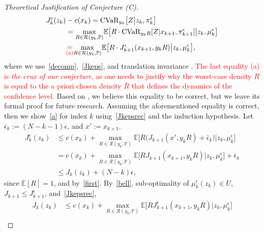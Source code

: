 \documentclass[letterpaper, 10 pt, conference]{ieeeconf}  %
\newcommand{\mpc}[1]{{\color{cyan} #1}}
\newcommand{\mpc}[1]{#1}
\begin{document}
\begin{proof}[Theoretical Justification of Conjecture (C)]
%
\begin{equation*}\begin{aligned}
J_k^\epsilon(z_k)& - c(x_k) = \text{CVaR}_{y_k}\big[ Z \big| z_k, \pi_k^\epsilon \big]\\
& = {\underset{R \in \mathcal{R}(y_k, \mathbb{P})}\max}\mathbb{E}\big[ R\cdot \text{CVaR}_{y_k R}[ Z | x_{k+1}, \pi^\epsilon_{k+1} ] \big| z_k, \mu_k^\epsilon \big] \\
& \textcolor{red}{\underset{(a)}{=}} {\underset{R \in \mathcal{R}(y_k, \mathbb{P})}\max}\mathbb{E}\big[ R\cdot J_{k+1}^\epsilon(x_{k+1},y_k R) \big| z_k, \mu_k^\epsilon \big],
\end{aligned}\end{equation*}
%
where we use~\eqref{decomp},~\eqref{Jkeps}, and translation invariance\footnotemark 
{}. \textcolor{red}{The last equality (a) is {\em the crux of our conjecture}, as one needs to justify why the worst-case density $R$ is equal to the a priori chosen density $\bar{R}$ that defines the dynamics of the confidence level.} \mpc{Based on \cite{chow2015risk}, we believe this equality to be correct, but we leave its formal proof for future research}. \mpc{Assuming the aforementioned equality is correct, then we} show~\eqref{a} for index $k$ using~\eqref{Jkepsrec} and the induction hypothesis. Let $\bar{\epsilon}_k := (N-k-1)\epsilon$, and $x' := x_{k+1}$.
%
\begin{equation*}\begin{aligned}
J_k^\epsilon(z_k) & \leq c(x_k) + {\underset{R \in \mathcal{R}(y_k, \mathbb{P})}\max} \mathbb{E}\big[ R\big(J_{k+1}(x',y_k R) + \bar{\epsilon}_k\big) \big| z_k, \mu_k^\epsilon \big]\\
& = c(x_k) + {\underset{R \in \mathcal{R}(y_k, \mathbb{P})}\max} \mathbb{E}\big[ R J_{k+1}(x_{k+1},y_k R) \big| z_k, \mu_k^\epsilon \big] + \bar{\epsilon}_k\\ 
& \leq J_k(z_k) + (N-k)\epsilon,
\end{aligned}\end{equation*}
%
since $\mathbb{E}[R] = 1$, and by~\eqref{first}. By~\eqref{bell}, sub-optimality of $\mu_k^\epsilon(z_k) \in U$, $J_{k+1} \leq J^\epsilon_{k+1}$, and~\eqref{Jkepsrec},
%
\begin{equation*}\begin{aligned}
J_k(z_k) & \leq c(x_k) + {\underset{R \in \mathcal{R}(y_k, \mathbb{P})}\max} \mathbb{E}\big[ R J^\epsilon_{k+1}(x_{k+1},y_k R) \big| z_k, \mu_k^\epsilon \big]\\

\end{aligned}
\end{equation*}
\end{proof}
\end{document}
